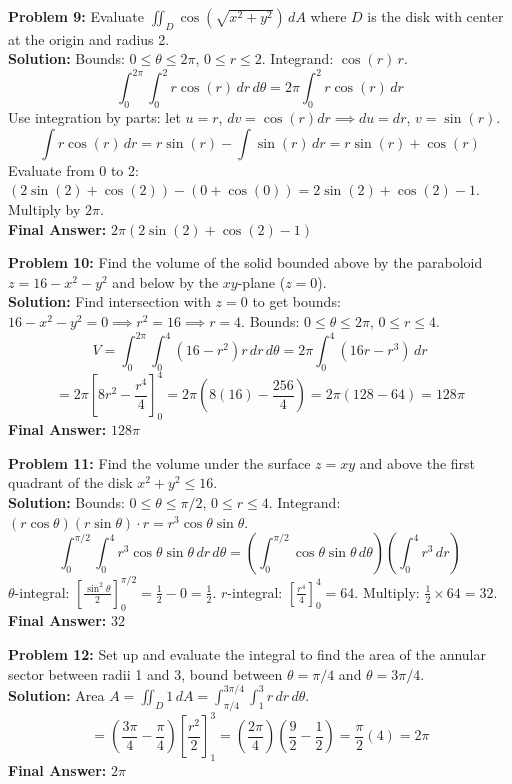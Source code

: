 \documentclass[11pt]{article}
\begin{document}
\vspace{0.5cm}
\textbf{Problem 9:} Evaluate $\iint_D \cos\left(\sqrt{x^2+y^2}\right) \, dA$ where $D$ is the disk with center at the origin and radius 2.
\\
\textbf{Solution:}
Bounds: $0 \le \theta \le 2\pi$, $0 \le r \le 2$. Integrand: $\cos(r) \, r$.
$$ \int_0^{2\pi} \int_0^2 r\cos(r) \, dr \, d\theta = 2\pi \int_0^2 r\cos(r) \, dr $$
Use integration by parts: let $u=r$, $dv=\cos(r)dr \implies du=dr$, $v=\sin(r)$.
$$ \int r\cos(r) \, dr = r\sin(r) - \int \sin(r) \, dr = r\sin(r) + \cos(r) $$
Evaluate from 0 to 2: $(2\sin(2) + \cos(2)) - (0 + \cos(0)) = 2\sin(2) + \cos(2) - 1$. Multiply by $2\pi$.
\\
\textbf{Final Answer:} $2\pi(2\sin(2) + \cos(2) - 1)$

\vspace{0.5cm}
\textbf{Problem 10:} Find the volume of the solid bounded above by the paraboloid $z = 16 - x^2 - y^2$ and below by the $xy$-plane ($z=0$).
\\
\textbf{Solution:}
Find intersection with $z=0$ to get bounds: $16 - x^2 - y^2 = 0 \implies r^2 = 16 \implies r = 4$.
Bounds: $0 \le \theta \le 2\pi$, $0 \le r \le 4$.
$$ V = \int_0^{2\pi} \int_0^4 (16 - r^2) r \, dr \, d\theta = 2\pi \int_0^4 (16r - r^3) \, dr $$
$$ = 2\pi \left[ 8r^2 - \frac{r^4}{4} \right]_0^4 = 2\pi \left( 8(16) - \frac{256}{4} \right) = 2\pi (128 - 64) = 128\pi $$
\textbf{Final Answer:} $128\pi$

\vspace{0.5cm}
\textbf{Problem 11:} Find the volume under the surface $z = xy$ and above the first quadrant of the disk $x^2+y^2 \le 16$.
\\
\textbf{Solution:}
Bounds: $0 \le \theta \le \pi/2$, $0 \le r \le 4$.
Integrand: $(r\cos\theta)(r\sin\theta) \cdot r = r^3 \cos\theta \sin\theta$.
$$ \int_0^{\pi/2} \int_0^4 r^3 \cos\theta\sin\theta \, dr \, d\theta = \left( \int_0^{\pi/2} \cos\theta\sin\theta \, d\theta \right) \left( \int_0^4 r^3 \, dr \right) $$
$\theta$-integral: $\left[ \frac{\sin^2\theta}{2} \right]_0^{\pi/2} = \frac{1}{2} - 0 = \frac{1}{2}$.
$r$-integral: $\left[ \frac{r^4}{4} \right]_0^4 = 64$.
Multiply: $\frac{1}{2} \times 64 = 32$.
\\
\textbf{Final Answer:} $32$

\vspace{0.5cm}
\textbf{Problem 12:} Set up and evaluate the integral to find the area of the annular sector between radii 1 and 3, bound between $\theta = \pi/4$ and $\theta = 3\pi/4$.
\\
\textbf{Solution:}
Area $A = \iint_D 1 \, dA = \int_{\pi/4}^{3\pi/4} \int_1^3 r \, dr \, d\theta $.
$$ = \left( \frac{3\pi}{4} - \frac{\pi}{4} \right) \left[ \frac{r^2}{2} \right]_1^3 = \left( \frac{2\pi}{4} \right) \left( \frac{9}{2} - \frac{1}{2} \right) = \frac{\pi}{2} (4) = 2\pi $$
\textbf{Final Answer:} $2\pi$
\end{document}
